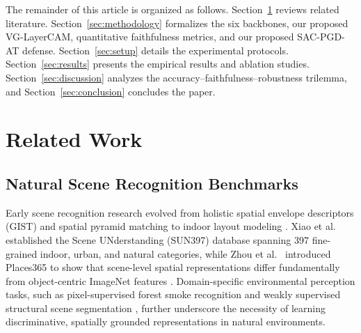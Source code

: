 \documentclass[final,5p,times,twocolumn]{elsarticle}
\begin{document}
The remainder of this article is organized as follows. Section~\ref{sec:related_work} reviews related literature. Section~\ref{sec:methodology} formalizes the six backbones, our proposed VG-LayerCAM, quantitative faithfulness metrics, and our proposed SAC-PGD-AT defense. Section~\ref{sec:setup} details the experimental protocols. Section~\ref{sec:results} presents the empirical results and ablation studies. Section~\ref{sec:discussion} analyzes the accuracy--faithfulness--robustness trilemma, and Section~\ref{sec:conclusion} concludes the paper.

\section{Related Work}
\label{sec:related_work}

\subsection{Natural Scene Recognition Benchmarks}
Early scene recognition research evolved from holistic spatial envelope descriptors (GIST) \cite{oliva2001modeling} and spatial pyramid matching \cite{lazebnik2006beyond} to indoor layout modeling \cite{quattoni2009recognizing}. Xiao et al.\ \cite{xiao2010sun,xiao2016sun} established the Scene UNderstanding (SUN397) database spanning 397 fine-grained indoor, urban, and natural categories, while Zhou et al.\ \cite{zhou2017places} introduced Places365 to show that scene-level spatial representations differ fundamentally from object-centric ImageNet features \cite{deng2009imagenet,zhou2016learning}. Domain-specific environmental perception tasks, such as pixel-supervised forest smoke recognition \cite{tao2023smoke} and weakly supervised structural scene segmentation \cite{apedo2025crack}, further underscore the necessity of learning discriminative, spatially grounded representations in natural environments.
\end{document}
